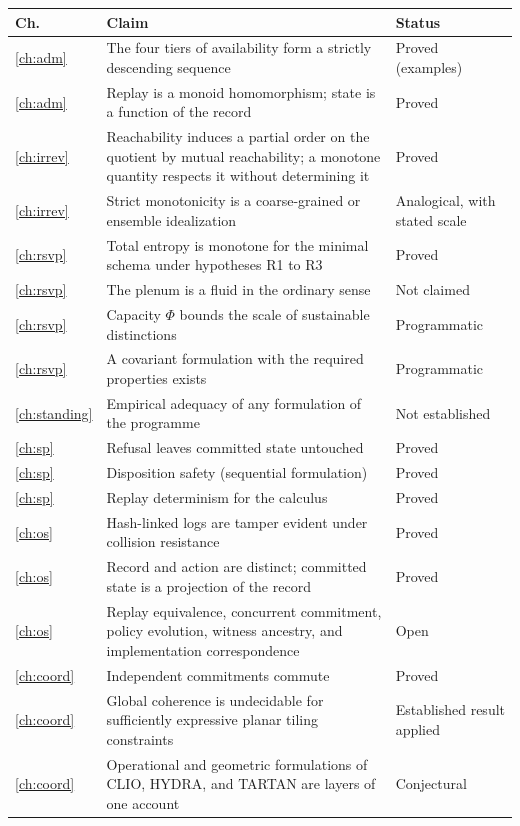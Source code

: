 \documentclass[11pt,twoside,openright]{book}
\theoremstyle{plain}
\theoremstyle{definition}
\theoremstyle{remark}
\begin{document}
\begin{center}
\small
\begin{tabularx}{\textwidth}{@{}p{}Xp{}@{}}
\toprule
Ch. & Claim & Status\\
\midrule
\ref{ch:adm} & The four tiers of availability form a strictly descending sequence & Proved (examples)\\
\ref{ch:adm} & Replay is a monoid homomorphism; state is a function of the record & Proved\\
\ref{ch:irrev} & Reachability induces a partial order on the quotient by mutual reachability; a monotone quantity respects it without determining it & Proved\\
\ref{ch:irrev} & Strict monotonicity is a coarse-grained or ensemble idealization & Analogical, with stated scale\\
\ref{ch:rsvp} & Total entropy is monotone for the minimal schema under hypotheses R1 to R3 & Proved\\
\ref{ch:rsvp} & The plenum is a fluid in the ordinary sense & Not claimed\\
\ref{ch:rsvp} & Capacity $\Phi$ bounds the scale of sustainable distinctions & Programmatic\\
\ref{ch:rsvp} & A covariant formulation with the required properties exists & Programmatic\\
\ref{ch:standing} & Empirical adequacy of any formulation of the programme & Not established\\
\ref{ch:sp} & Refusal leaves committed state untouched & Proved\\
\ref{ch:sp} & Disposition safety (sequential formulation) & Proved\\
\ref{ch:sp} & Replay determinism for the calculus & Proved\\
\ref{ch:os} & Hash-linked logs are tamper evident under collision resistance & Proved\\
\ref{ch:os} & Record and action are distinct; committed state is a projection of the record & Proved\\
\ref{ch:os} & Replay equivalence, concurrent commitment, policy evolution, witness ancestry, and implementation correspondence & Open\\
\ref{ch:coord} & Independent commitments commute & Proved\\
\ref{ch:coord} & Global coherence is undecidable for sufficiently expressive planar tiling constraints & Established result applied\\
\ref{ch:coord} & Operational and geometric formulations of CLIO, HYDRA, and TARTAN are layers of one account & Conjectural\\

\end{tabularx}
\end{center}
\end{document}
